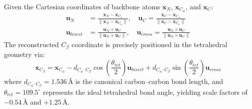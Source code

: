 \documentclass[10pt,twocolumn,a4paper]{article}
\begin{document}
Given the Cartesian coordinates of backbone atoms $\mathbf{x}_N$, $\mathbf{x}_{C_\alpha}$, and $\mathbf{x}_C$:
\begin{align}
\mathbf{u}_{N} &= \frac{\mathbf{x}_N - \mathbf{x}_{C_\alpha}}{\|\mathbf{x}_N - \mathbf{x}_{C_\alpha}\|}, \quad \mathbf{u}_{C} = \frac{\mathbf{x}_C - \mathbf{x}_{C_\alpha}}{\|\mathbf{x}_C - \mathbf{x}_{C_\alpha}\|} \\
\mathbf{u}_{bisect} &= \frac{\mathbf{u}_{N} + \mathbf{u}_{C}}{\|\mathbf{u}_{N} + \mathbf{u}_{C}\|}, \quad \mathbf{u}_{cross} = \frac{\mathbf{u}_{N} \times \mathbf{u}_{C}}{\|\mathbf{u}_{N} \times \mathbf{u}_{C}\|}
\end{align}
The reconstructed $C_\beta$ coordinate is precisely positioned in the tetrahedral geometry via:
\begin{equation}
\mathbf{x}_{C_\beta} = \mathbf{x}_{C_\alpha} - d_{C_\alpha\text{--}C_\beta} \cos\left(\frac{\theta_{tet}}{2}\right) \mathbf{u}_{bisect} + d_{C_\alpha\text{--}C_\beta} \sin\left(\frac{\theta_{tet}}{2}\right) \mathbf{u}_{cross}
\label{eq:corn}
\end{equation}
where $d_{C_\alpha\text{--}C_\beta} = 1.536\,\text{\AA}$ is the canonical carbon--carbon bond length, and $\theta_{tet} = 109.5^\circ$ represents the ideal tetrahedral bond angle, yielding scale factors of $-0.54\,\text{\AA}$ and $+1.25\,\text{\AA}$.
\end{document}
